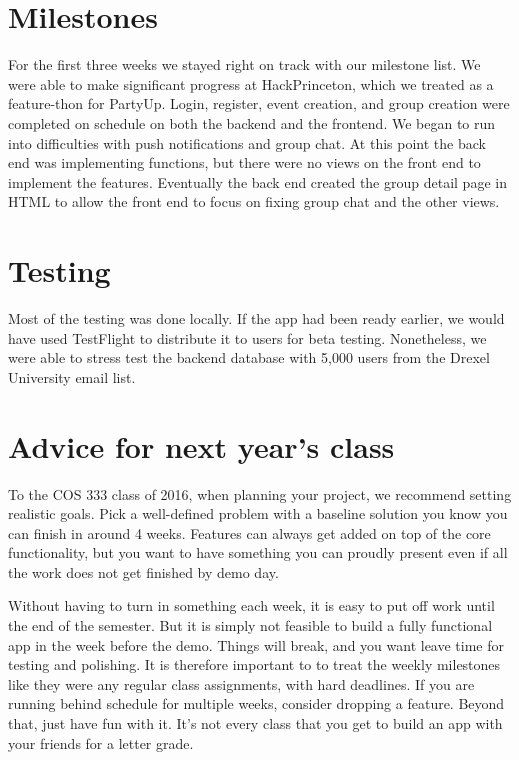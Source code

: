 \documentclass[12pt]{article}
\begin{document}
\section{Milestones}

For the first three weeks we stayed right on track with our milestone list. 
We were able to make significant progress at HackPrinceton, which we treated as a feature-thon for PartyUp. 
Login, register, event creation, and group creation were completed on schedule on both the backend and the frontend. 
We began to run into difficulties with push notifications and group chat. 
At this point the back end was implementing functions, but there were no views on the front end to implement the features. 
Eventually the back end created the group detail page in HTML to allow the front end to focus on fixing group chat and the other views. 

\bigskip

\section{Testing}

Most of the testing was done locally. 
If the app had been ready earlier, we would have used TestFlight to distribute it to users for beta testing. 
Nonetheless, we were able to stress test the backend database with 5,000 users from the Drexel University email list.

\section{Advice for next year's class}

To the COS 333 class of 2016, when planning your project, we recommend setting realistic goals. 
Pick a well-defined problem with a baseline solution you know you can finish in around 4 weeks.
Features can always get added on top of the core functionality, but you want to have something you
can proudly present even if all the work does not get finished by demo day.

Without having to turn in something each week, it is easy to put off work until the end of the semester.
But it is simply not feasible to build a fully functional app in the week before the demo. 
Things will break, and you want leave time for testing and polishing.
It is therefore important to to treat the weekly milestones like they were any regular class assignments, with hard deadlines. 
If you are running behind schedule for multiple weeks, consider dropping a feature.
Beyond that, just have fun with it. It's not every class that you get to build an app with your friends for a letter grade.
\end{document}
